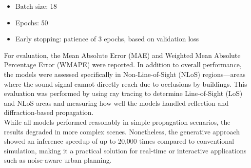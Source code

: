 			\begin{itemize}
				\item Batch size: 18
				\item Epochs: 50
				\item Early stopping: patience of 3 epochs, based on validation loss
			\end{itemize}
			For evaluation, the Mean Absolute Error (MAE) and Weighted Mean Absolute Percentage Error (WMAPE) were reported. In addition to overall performance, the models were assessed specifically in Non-Line-of-Sight (NLoS) regions—areas where the sound signal cannot directly reach due to occlusions by buildings. This evaluation was performed by using ray tracing to determine Line-of-Sight (LoS) and NLoS areas and measuring how well the models handled reflection and diffraction-based propagation.\\
			While all models performed reasonably in simple propagation scenarios, the results degraded in more complex scenes. Nonetheless, the generative approach showed an inference speedup of up to 20{,}000 times compared to conventional simulation, making it a practical solution for real-time or interactive applications such as noise-aware urban planning.
			
			
